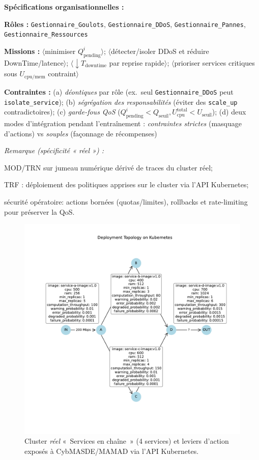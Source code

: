 \noindent\textbf{Spécifications organisationnelles :}
\begin{enumerate*}[label={\roman*)}, itemjoin={;\quad}]
  \item \textbf{Rôles :} \texttt{Gestionnaire\_Goulots}, \texttt{Gestionnaire\_DDoS}, \texttt{Gestionnaire\_Pannes}, \texttt{Gestionnaire\_Ressources}
  \item \textbf{Missions :}
  \(\langle\)minimiser \(Q_{\text{pending}}^i\)\(\rangle\);
  \(\langle\)détecter/isoler DDoS et réduire DownTime/latence\(\rangle\);
  \(\langle\)\(\downarrow T_{\text{downtime}}\) par reprise rapide\(\rangle\);
  \(\langle\)prioriser services critiques sous \(U_{\text{cpu/mem}}\) contraint\(\rangle\)
  \item \textbf{Contraintes :}
  (a) \emph{déontiques} par rôle (ex.~seul \texttt{Gestionnaire\_DDoS} peut \texttt{isolate\_service});
  (b) \emph{ségrégation des responsabilités} (éviter des \texttt{scale\_up} contradictoires);
  (c) \emph{garde-fous QoS} (\(Q_{\text{pending}}^i<Q_{\text{seuil}}, U_{\text{cpu}}^{\text{total}}<U_{\text{seuil}}\));
  (d) deux modes d’intégration pendant l’entraînement : \textit{contraintes strictes} (masquage d’actions) vs \textit{souples} (façonnage de récompenses)
\end{enumerate*}

\medskip
\noindent\textit{Remarque (spécificité « réel ») :}
\begin{enumerate*}[label={--}, itemjoin={\quad}]
  \item \textsc{MOD/TRN} sur jumeau numérique dérivé de traces du cluster réel;
  \item \textsc{TRF} : déploiement des politiques apprises sur le cluster via l’API Kubernetes;
  \item sécurité opératoire: actions bornées (quotas/limites), rollbacks et rate-limiting pour préserver la QoS.
\end{enumerate*}

\begin{figure}[h!]
  \centering
  \includegraphics[trim=1.8cm 3.3cm 1.25cm 3.5cm, clip, width=0.6\linewidth]{figures/k8s_cluster_graph.pdf}
  \caption{Cluster \emph{réel} «~Services en chaîne~» (4 services) et leviers d’action exposés à CybMASDE/MAMAD via l’API Kubernetes.}
  \label{fig:k8s_microservices_real}
\end{figure}

